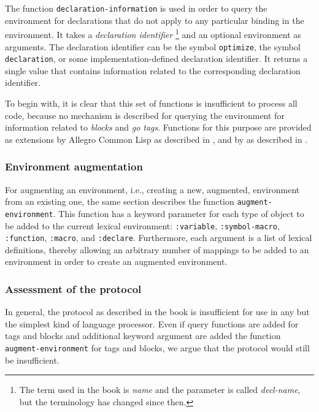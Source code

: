 The function \texttt{declaration-information} is used in order to
query the environment for declarations that do not apply to any
particular binding in the environment.  It takes a \emph{declaration
  identifier}%
\footnote{The term used in the book is \emph{name} and the parameter
  is called \textit{decl-name}, but the terminology has changed since
  then.} 
and an optional environment as arguments.  The declaration identifier
can be the symbol \texttt{optimize}, the symbol \texttt{declaration},
or some implementation-defined declaration identifier.  It returns a
single value that contains information related to the corresponding
declaration identifier.

To begin with, it is clear that this set of functions is insufficient
to process all \commonlisp{} code, because no mechanism is described
for querying the environment for information related to \emph{blocks}
and \emph{go tags}.  Functions for this purpose are provided as
extensions by Allegro Common Lisp as described in
, and by \lispworks{} as described in
.

\subsubsection{Environment augmentation}

For augmenting an environment, i.e., creating a new, augmented,
environment from an existing one, the same section describes the
function \texttt{augment-environment}.  This function has a keyword
parameter for each type of object to be added to the current lexical
environment: \texttt{:variable}, \texttt{:symbol-macro},
\texttt{:function}, \texttt{:macro}, and \texttt{:declare}.
Furthermore, each argument is a list of lexical definitions, thereby
allowing an arbitrary number of mappings to be added to an environment
in order to create an augmented environment.

\subsubsection{Assessment of the protocol}

In general, the protocol as described in the book is insufficient for
use in any but the simplest kind of language processor.  Even if
query functions are added for tags and blocks and additional keyword
argument are added the function \texttt{augment-environment} for tags
and blocks, we argue that the protocol would still be insufficient.

